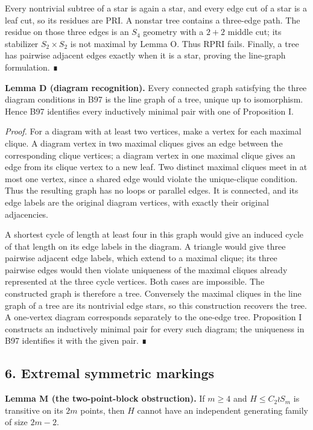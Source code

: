 \documentclass[
  10pt,
  letterpaper,
]{article}
\begin{document}
Every nontrivial subtree of a star is again a star, and every edge cut
of a star is a leaf cut, so its residues are PRI. A nonstar tree
contains a three-edge path. The residue on those three edges is an
\(S_4\) geometry with a \(2+2\) middle cut; its stabilizer
\(S_2\times S_2\) is not maximal by Lemma O. Thus RPRI fails. Finally, a
tree has pairwise adjacent edges exactly when it is a star, proving the
line-graph formulation. ∎

\textbf{Lemma D (diagram recognition).} Every connected graph satisfying
the three diagram conditions in B97 is the line graph of a tree, unique
up to isomorphism. Hence B97 identifies every inductively minimal pair
with one of Proposition I.

\emph{Proof.} For a diagram with at least two vertices, make a vertex
for each maximal clique. A diagram vertex in two maximal cliques gives
an edge between the corresponding clique vertices; a diagram vertex in
one maximal clique gives an edge from its clique vertex to a new leaf.
Two distinct maximal cliques meet in at most one vertex, since a shared
edge would violate the unique-clique condition. Thus the resulting graph
has no loops or parallel edges. It is connected, and its edge labels are
the original diagram vertices, with exactly their original adjacencies.

A shortest cycle of length at least four in this graph would give an
induced cycle of that length on its edge labels in the diagram. A
triangle would give three pairwise adjacent edge labels, which extend to
a maximal clique; its three pairwise edges would then violate uniqueness
of the maximal cliques already represented at the three cycle vertices.
Both cases are impossible. The constructed graph is therefore a tree.
Conversely the maximal cliques in the line graph of a tree are its
nontrivial edge stars, so this construction recovers the tree. A
one-vertex diagram corresponds separately to the one-edge tree.
Proposition I constructs an inductively minimal pair for every such
diagram; the uniqueness in B97 identifies it with the given pair. ∎

\subsection{6. Extremal symmetric
markings}\label{extremal-symmetric-markings}

\textbf{Lemma M (the two-point-block obstruction).} If \(m\geq4\) and
\(H\leq C_2\wr S_m\) is transitive on its \(2m\) points, then \(H\)
cannot have an independent generating family of size \(2m-2\).
\end{document}

